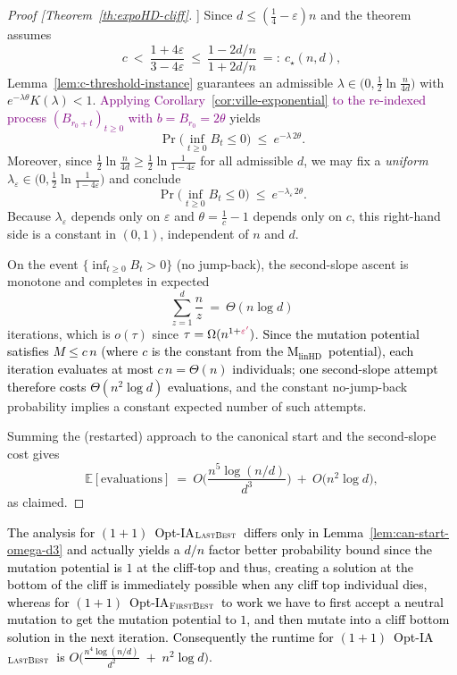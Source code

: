 \documentclass[lettersize,journal]{IEEEtran}
\newcommand{\rerev}[1]{\textcolor{purple}{#1}}
\newcommand{\EE}{\mathbb{E}}
\newcommand{\linHD}{M$_{\text{linHD}}$}
\newcommand{\firstBest}{$(1+1)$~Opt-IA$_{\textsc{FirstBest}}$}
\newcommand{\lastBest}{$(1+1)$~Opt-IA$_{\textsc{LastBest}}$}
\begin{document}
{\begin{proof}[Proof [Theorem~\ref{th:expoHD-cliff}]]
	Since $d\le(\tfrac14-\varepsilon)n$ and the theorem assumes
	\[
	c\ <\ \frac{1+4\varepsilon}{3-4\varepsilon}\ \le\ \frac{1-2d/n}{1+2d/n}\ =:\ c_\star(n,d),
	\]
	Lemma~\ref{lem:c-threshold-instance} guarantees an admissible $\lambda\in\big(0,\tfrac12\ln\tfrac{n}{4d}\big)$ with $e^{-\lambda\theta}K(\lambda)<1$.
	\rerev{Applying Corollary~\ref{cor:ville-exponential} to the re-indexed process $(B_{r_0+t})_{t\ge0}$ with $b=B_{r_0}=2\theta$} yields
	\[
	\Pr\!\Big(\inf_{t\ge 0} B_t\le 0\Big)\ \le\ e^{-\lambda\,2\theta}.
	\]
	Moreover, since $\tfrac12\ln\!\tfrac{n}{4d}\ge \tfrac12\ln\!\tfrac{1}{1-4\varepsilon}$ for all admissible $d$, we may fix a \emph{uniform} $\lambda_\varepsilon\in\big(0,\tfrac12\ln\tfrac{1}{1-4\varepsilon}\big)$ and conclude
	\[
	\Pr\!\Big(\inf_{t\ge 0} B_t\le 0\Big)\ \le\ e^{-\lambda_\varepsilon\,2\theta}.
	\]
	Because $\lambda_\varepsilon$ depends only on $\varepsilon$ and $\theta=\tfrac1c-1$ depends only on $c$, this right-hand side is a constant in $(0,1)$, independent of $n$ and $d$.
	
	\smallskip
	On the event $\{\inf_{t\ge 0} B_t>0\}$ (no jump-back), the second-slope ascent is monotone and completes in expected
	\[
	\sum_{z=1}^{d}\frac{n}{z}\ =\ \Theta(n\log d)
	\]
	iterations, which is $o(\tau)$ since $\tau=\Omega(n^{1+\rerev{\varepsilon'}})$. \textcolor{black}{Since the mutation potential satisfies $M \le c\,n$ (where $c$ is the constant
	from the \linHD\ potential), each iteration evaluates at most $c\,n =\Theta(n)$
	individuals; one second-slope attempt therefore costs $\Theta(n^{2}\log d)$
	evaluations,} and the constant no-jump-back probability implies a constant expected number of such attempts.
	
	\smallskip

	Summing the (restarted) approach to the canonical start and the second-slope cost gives
	\[
	\EE[\text{evaluations}]
	\ =\ O\!\Big(\frac{n^{5}\log(n/d)}{d^{3}}\Big)\ +\ O\!\big(n^{2}\log d\big),
	\]
	as claimed.
\end{proof}

\textcolor{black}{The analysis for \lastBest~differs only in Lemma~\ref{lem:can-start-omega-d3} and actually yields a $d/n$ factor better probability bound since the mutation potential is $1$ at the cliff-top and thus, creating a solution at the bottom of the cliff is immediately possible when any cliff top individual dies, whereas for \firstBest~to work we have to first accept a neutral mutation to get the mutation potential to $1$, and then mutate into a cliff bottom solution in the next iteration. Consequently the runtime for \lastBest~is  
$O\!\Big(\frac{n^{4}\log(n/d)}{d^{2}} \;+\; n^{2}\log d\Big)$.}

}
\end{document}
